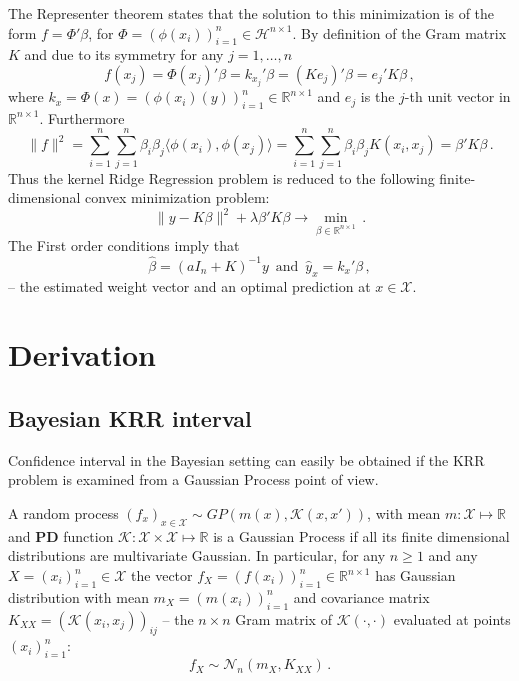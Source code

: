 \documentclass{ITaSconf}
\newcommand{\Hcal}{\mathcal{H}}
\newcommand{\Ncal}{\mathcal{N}}
\newcommand{\Kcal}{\mathcal{K}}
\newcommand{\Xcal}{\mathcal{X}}
\newcommand{\Real}{\mathbb{R}}
\begin{document}
The Representer theorem states that the solution to this minimization is of the form
$f = \Phi'\beta$, for $\Phi = (\phi(x_i))_{i=1}^n \in \Hcal^{n\times 1}$. By definition
of the Gram matrix $K$ and due to its symmetry for any $j=1,\ldots,n$
$$ f(x_j)
  = \Phi(x_j)' \beta
  = k_{x_j}' \beta
  = (K e_j)' \beta
  = e_j' K \beta
  \,, $$
where $k_x = \Phi(x) = (\phi(x_i)(y))_{i=1}^n \in \Real^{n\times 1}$ and $e_j$ is
the $j$-th unit vector in $\Real^{n\times 1}$. Furthermore
$$ \| f \|^2
  = \sum_{i=1}^n\sum_{j=1}^n\beta_i\beta_j \langle\phi(x_i), \phi(x_j)\rangle
  = \sum_{i=1}^n\sum_{j=1}^n\beta_i\beta_j K(x_i, x_j)
  = \beta' K \beta \,. $$
Thus the kernel Ridge Regression problem is reduced to the following finite-dimensional
convex minimization problem:
$$ \|y - K \beta \|^2 + \lambda \beta' K \beta \to \min_{\beta\in \Real^{n\times 1}} \,. $$
The First order conditions imply that
$$ \hat{\beta} = (aI_n + K)^{-1} y \,\text{ and }\, \hat{y}_x = k_x' \beta \,, $$
-- the estimated weight vector and an optimal prediction at $x\in \Xcal$.



\section{Derivation} %
\label{sec:derivation}

\subsection{Bayesian KRR interval} %
\label{sub:bayesian_krr_interval}

Confidence interval in the Bayesian setting can easily be obtained if the KRR
problem is examined from a Gaussian Process point of view.

A random process $(f_x)_{x\in \Xcal} \sim GP(m(x), \Kcal(x,x'))$, with mean $m : \Xcal
\mapsto \Real$ and \textbf{PD} function $\Kcal : \Xcal \times \Xcal \mapsto \Real$
is a Gaussian Process if all its finite dimensional distributions are multivariate
Gaussian. In particular, for any $n\geq1$ and any $X = (x_i)_{i=1}^n \in \Xcal$ the
vector $f_X = (f(x_i))_{i=1}^n \in \Real^{n\times 1}$ has Gaussian distribution with
mean $m_X = (m(x_i))_{i=1}^n$ and covariance matrix $K_{XX} = (\Kcal(x_i,x_j))_{ij}$ --
the $n\times n$ Gram matrix of $\Kcal(\cdot,\cdot)$ evaluated at points $(x_i)_{i=1}^n$:
\begin{equation*}
  f_X \sim \Ncal_n(m_X, K_{XX}) \,.
\end{equation*}
\end{document}
